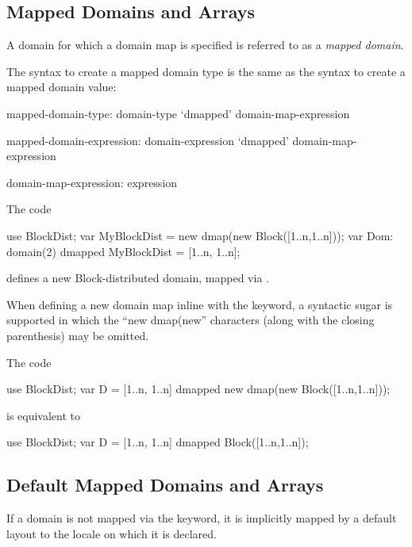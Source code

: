 \subsection{Mapped Domains and Arrays}
\label{Mapped_Domains_and_Arrays}

A domain for which a domain map is specified is referred to as a {\em
mapped domain}.

The syntax to create a mapped domain type is the same as the syntax to
create a mapped domain value:
\begin{syntax}
mapped-domain-type:
  domain-type `dmapped' domain-map-expression

mapped-domain-expression:
  domain-expression `dmapped' domain-map-expression

domain-map-expression:
  expression
\end{syntax}

\begin{example}
The code
\begin{chapel}
use BlockDist;
var MyBlockDist = new dmap(new Block([1..n,1..n]));
var Dom: domain(2) dmapped MyBlockDist = [1..n, 1..n];
\end{chapel}
defines a new Block-distributed domain, mapped via .
\end{example}

When defining a new domain map inline with the  keyword,
a syntactic sugar is supported in which the ``new dmap(new''
characters (along with the closing parenthesis) may be omitted.
\begin{example}
The code
\begin{chapel}
use BlockDist;
var D = [1..n, 1..n] dmapped new dmap(new Block([1..n,1..n]));
\end{chapel}
is equivalent to
\begin{chapel}
use BlockDist;
var D = [1..n, 1..n] dmapped Block([1..n,1..n]);
\end{chapel}
\end{example}

\subsection{Default Mapped Domains and Arrays}
\label{Default_Mapped_Domains_and_Arrays}

If a domain is not mapped via the  keyword, it is
implicitly mapped by a default layout to the locale on which it is
declared.
